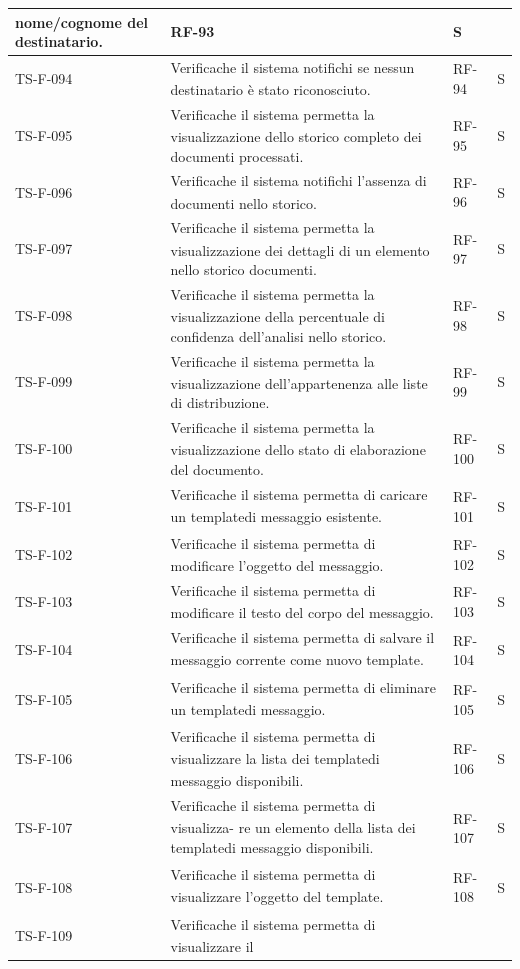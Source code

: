 \documentclass[a4paper,11pt]{article}
\renewcommand{\G}{\texorpdfstring{\textsubscript{\scalebox{0.6}{\textbf{G}}}\xspace}{ G}}
\begin{document}
\begin{longtable}{|p{2.2cm}|p{8.3cm}|p{2cm}|p{1.5cm}|}
nome/cognome del destinatario. & RF-93 & S \\ \hline
TS-F-094 & Verifica\G che il sistema notifichi se nessun
destinatario è stato riconosciuto. & RF-94 & S \\ \hline
TS-F-095 & Verifica\G che il sistema permetta la visualizzazione dello storico
completo dei documenti processati. & RF-95 & S \\ \hline
TS-F-096 & Verifica\G che il sistema notifichi l’assenza di
documenti nello storico. & RF-96 & S \\ \hline
TS-F-097 & Verifica\G che il sistema permetta la visualizzazione dei dettagli di un
elemento nello storico documenti. & RF-97 & S \\ \hline
TS-F-098 & Verifica\G che il sistema permetta la visualizzazione della percentuale di
confidenza dell’analisi nello storico. & RF-98 & S \\ \hline
TS-F-099 & Verifica\G che il sistema permetta la visualizzazione dell’appartenenza
alle liste di distribuzione. & RF-99 & S \\ \hline
TS-F-100 & Verifica\G che il sistema permetta la visualizzazione dello stato di
elaborazione del documento. & RF-100 & S \\ \hline
TS-F-101 & Verifica\G che il sistema permetta di caricare un
template\G di messaggio esistente. & RF-101 & S \\ \hline
TS-F-102 & Verifica\G che il sistema permetta di modificare
l’oggetto del messaggio. & RF-102 & S \\ \hline
TS-F-103 & Verifica\G che il sistema permetta di modificare il
testo del corpo del messaggio. & RF-103 & S \\ \hline
TS-F-104 & Verifica\G che il sistema permetta di salvare il
messaggio corrente come nuovo template\G. & RF-104 & S \\ \hline
TS-F-105 & Verifica\G che il sistema permetta di eliminare un
template\G di messaggio. & RF-105 & S \\ \hline
TS-F-106 & Verifica\G che il sistema permetta di visualizzare la
lista dei template\G di messaggio disponibili. & RF-106 & S \\ \hline
TS-F-107 & Verifica\G che il sistema permetta di visualizza-
re un elemento della lista dei template\G di
messaggio disponibili. & RF-107 & S \\ \hline
TS-F-108 & Verifica\G che il sistema permetta di visualizzare
l’oggetto del template\G. & RF-108 & S \\ \hline
TS-F-109 & Verifica\G che il sistema permetta di visualizzare il

\end{longtable}
\end{document}
